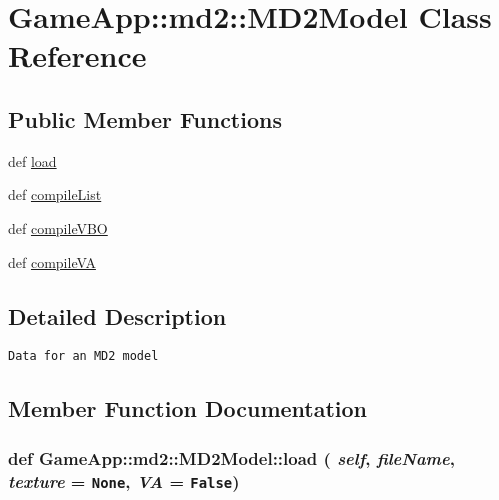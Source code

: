 \hypertarget{classGameApp_1_1md2_1_1MD2Model}{
\section{GameApp::md2::MD2Model Class Reference}
\label{classGameApp_1_1md2_1_1MD2Model}
}
\subsection*{Public Member Functions}
\begin{CompactItemize}
\item 
def \hyperlink{classGameApp_1_1md2_1_1MD2Model_713099bbaf5494623d0f41587ef9c28a}{load}
\item 
def \hyperlink{classGameApp_1_1md2_1_1MD2Model_58844d458c4a62763164a13728e607e6}{compileList}
\item 
def \hyperlink{classGameApp_1_1md2_1_1MD2Model_fb3e1caee5b759ca1ed6fcf1d72a5042}{compileVBO}
\item 
def \hyperlink{classGameApp_1_1md2_1_1MD2Model_1eab56441e822f92e54a95eebd2aa083}{compileVA}
\end{CompactItemize}


\subsection{Detailed Description}


\footnotesize\begin{verbatim}Data for an MD2 model \end{verbatim}
\normalsize
 

\subsection{Member Function Documentation}
\hypertarget{classGameApp_1_1md2_1_1MD2Model_713099bbaf5494623d0f41587ef9c28a}{
\subsubsection[load]{\setlength{\rightskip}{0pt plus 5cm}def GameApp::md2::MD2Model::load ( {\em self}, \/   {\em fileName}, \/   {\em texture} = {\tt None}, \/   {\em VA} = {\tt False})}}
\label{classGameApp_1_1md2_1_1MD2Model_713099bbaf5494623d0f41587ef9c28a}




